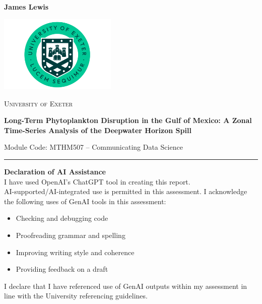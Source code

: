 \documentclass[
  11pt,
]{article}
\author{}
\date{}
\begin{document}
\begin{titlepage}
    \noindent
    \begin{flushleft}
        \textbf{James Lewis} \\
    \end{flushleft}

    \vspace*{0.8cm}
    \centering

    \centering
    \vspace*{1.5cm}

    \includegraphics[width=0.42\textwidth]{Uni-Exeter-logo-portrait-1.png}\par\vspace{1.2cm}

    {\scshape\Large University of Exeter \par}
    \vspace{1.2cm}

    {\Huge\bfseries Long-Term Phytoplankton Disruption in the Gulf of Mexico: A Zonal Time-Series Analysis of the Deepwater Horizon Spill \par}
    \vspace{0.6cm}

    {\large Module Code: MTHM507 – Communicating Data Science\par}
    
    \vspace*{0.8cm}

    \small
    \noindent\rule{\textwidth}{0.4pt}
    \vspace{0.2cm}

    \textbf{Declaration of AI Assistance} \\
    I have used OpenAI’s ChatGPT tool in creating this report. \\

    AI-supported/AI-integrated use is permitted in this assessment. I acknowledge the following uses of GenAI tools in this assessment:

    \begin{itemize}\itemsep0pt  
      \item Checking and debugging code
      \item Proofreading grammar and spelling
      \item Improving writing style and coherence
      \item Providing feedback on a draft
    \end{itemize}

    \vspace{-0.2cm}
    I declare that I have referenced use of GenAI outputs within my assessment in line with the University referencing guidelines.

\end{titlepage}
\end{document}
